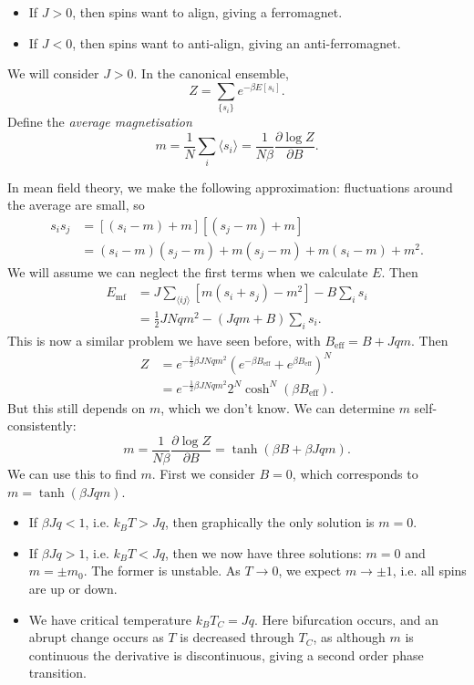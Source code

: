 \documentclass[12pt]{article}
\begin{document}
\begin{itemize}
	\item If $J > 0$, then spins want to align, giving a ferromagnet.
	\item If $J < 0$, then spins want to anti-align, giving an anti-ferromagnet.
\end{itemize}
We will consider $J > 0$. In the canonical ensemble,
\[
	Z = \sum_{\{s_i\}} e^{-\beta E[s_i]}.
\]
Define the \emph{average magnetisation}
\[
m = \frac{1}{N} \sum_i \langle s_i \rangle = \frac{1}{N \beta} \frac{\partial \log Z}{\partial B}.
\]

In mean field theory, we make the following approximation: fluctuations around the average are small, so
\begin{align*}
	s_i s_j &= [(s_i - m) + m][(s_j - m) + m] \\
		&= (s_i - m)(s_j - m) + m (s_j - m) + m (s_i - m) + m^2.
\end{align*}
We will assume we can neglect the first terms when we calculate $E$. Then
\begin{align*}
	E_{\mathrm{mf}} &= J \sum_{\langle i j \rangle} [m(s_i + s_j) - m^2] - B \sum_i s_i \\
			&= \frac{1}{2} J N q m^2 - (Jqm + B)\sum_i s_i.
\end{align*}
This is now a similar problem we have seen before, with $B_{\mathrm{eff}} = B + J qm$. Then
\begin{align*}
	Z &= e^{-\frac{1}{2} \beta J N q m^2} \left( e^{-\beta B_{\mathrm{eff}}} + e^{\beta B_{\mathrm{eff}}} \right)^N \\
	  &= e^{-\frac{1}{2} \beta J N q m^2} 2^N \cosh^N(\beta B_{\mathrm{eff}}).
\end{align*}
But this still depends on $m$, which we don't know. We can determine $m$ self-consistently:
\[
m = \frac{1}{N \beta} \frac{\partial \log Z}{\partial B} = \tanh ( \beta B + \beta J qm).
\]
We can use this to find $m$. First we consider $B = 0$, which corresponds to $m = \tanh(\beta J qm )$.
\begin{itemize}
	\item If $\beta J q < 1$, i.e. $k_B T > Jq$, then graphically the only solution is $m = 0$.
	\item If $\beta J q > 1$, i.e. $k_B T < Jq$, then we now have three solutions: $m = 0$ and $m = \pm m_0$. The former is unstable. As $T \to 0$, we expect $m \to \pm 1$, i.e. all spins are up or down.
	\item We have critical temperature $k_B T_C = Jq$. Here bifurcation occurs, and an abrupt change occurs as $T$ is decreased through $T_C$, as although $m$ is continuous the derivative is discontinuous, giving a second order phase transition.
\end{itemize}
\end{document}
